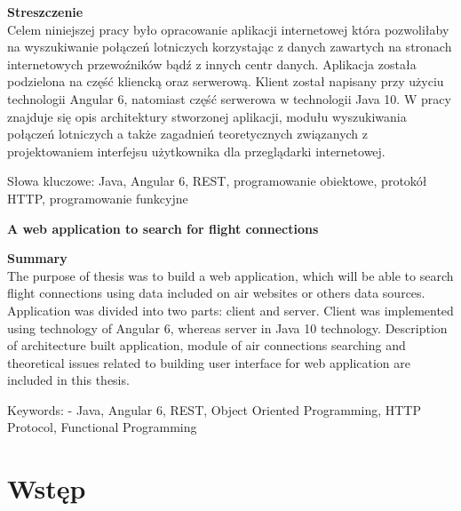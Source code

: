 \documentclass[a4paper, 12pt, twoside]{article}
\newcommand\tab[1][0.5cm]{\hspace*{#1}}
\newcommand\blankpage{%
	\null
    \thispagestyle{empty}%
    \newpage}
\begin{document}
\begin{flushleft}
	{\fontsize{14pt}{12pt}\selectfont
		\textbf{Streszczenie}}\\
	\vspace{1cm}
\tab Celem niniejszej pracy było opracowanie aplikacji internetowej która pozwoliłaby na wyszukiwanie połączeń lotniczych korzystając z danych zawartych na stronach internetowych przewoźników bądź z innych centr danych. Aplikacja została podzielona na część kliencką oraz serwerową. Klient został napisany przy użyciu technologii Angular 6, natomiast część serwerowa w technologii Java 10. W pracy znajduje się opis architektury stworzonej aplikacji, modułu wyszukiwania połączeń lotniczych a także zagadnień teoretycznych związanych z projektowaniem interfejsu użytkownika dla przeglądarki internetowej.
\end{flushleft}
\vspace{0.5cm}
Słowa kluczowe: Java, Angular 6, REST, programowanie obiektowe, protokół HTTP, programowanie funkcyjne

\vspace{1.5cm}

\begin{center}
	{\fontsize{14pt}{12pt}\selectfont
		\textbf{A web application to search for flight connections}}
\end{center}

\begin{flushleft}
	{\fontsize{14pt}{12pt}\selectfont
		\textbf{Summary}}\\
	\vspace{1cm}
\tab The purpose of thesis was to build a web application, which will be able to search flight connections using data included on air websites or others data sources. Application was divided into two parts: client and server. Client was implemented using technology of Angular 6, whereas server in Java 10 technology. Description of architecture built application, module of air connections searching and theoretical issues related to building user interface for web application are included in this thesis. 
\end{flushleft}
\vspace{0.5cm}
Keywords: - Java, Angular 6, REST, Object Oriented Programming, HTTP Protocol, Functional Programming
\afterpage{\blankpage}

\renewcommand{\contentsname}{Spis treści}
\newpage
{}
\setcounter{page}{9}
\tableofcontents

\newpage
\section{Wstęp}
\end{document}
